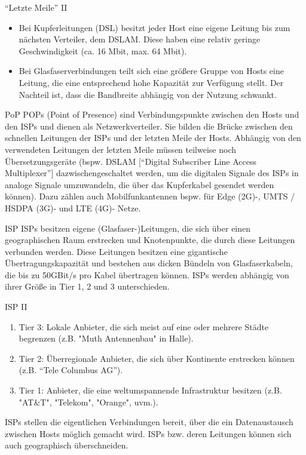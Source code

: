 \documentclass[utf8]{beamer}
\begin{document}
	\begin{frame}{\enquote{Letzte Meile} II}
		\begin{itemize}
			\item{Bei Kupferleitungen (DSL) besitzt jeder Host eine eigene Leitung bis zum nächsten Verteiler, dem DSLAM. Diese haben eine relativ geringe Geschwindigkeit (ca. 16 Mbit, max. 64 Mbit).}
			\item{Bei Glasfaserverbindungen teilt sich eine größere Gruppe von Hosts eine Leitung, die eine entsprechend hohe Kapazität zur Verfügung stellt. Der Nachteil ist, dass die Bandbreite abhängig von der Nutzung schwankt.}
		\end{itemize}
	\end{frame}
	
	\begin{frame}{PoP}
		POPs (Point of Presence) sind Verbindungspunkte zwischen den Hosts und den ISPs und dienen als Netzwerkverteiler. Sie bilden die Brücke zwischen den schnellen Leitungen der ISPs und der letzten Meile der Hosts. Abhängig von den verwendeten Leitungen der letzten Meile müssen teilweise noch Übersetzungsgeräte (bspw. DSLAM [\enquote{Digital Subscriber Line Access Multiplexer}] dazwischengeschaltet werden, um die digitalen Signale des ISPs in analoge Signale umzuwandeln, die über das Kupferkabel gesendet werden können).
		Dazu zählen auch Mobilfunkantennen bspw. für Edge (2G)-, UMTS / HSDPA (3G)- und LTE (4G)- Netze.
	\end{frame}
	
	\begin{frame}{ISP}
		ISPs besitzen eigene (Glasfaser-)Leitungen, die sich über einen geographischen Raum erstrecken und Knotenpunkte, die durch diese Leitungen verbunden werden. Diese Leitungen besitzen eine gigantische Übertragungskapazität und bestehen aus dicken Bündeln von Glasfaserkabeln, die bis zu 50GBit/s pro Kabel übertragen können.
		ISPs werden abhängig von ihrer Größe in Tier 1, 2 und 3 unterschieden.
	\end{frame}

	\begin{frame}{ISP II}
		\begin{enumerate}
			\item{Tier 3: Lokale Anbieter, die sich meist auf eine oder mehrere Städte begrenzen (z.B. "Muth Antennenbau" in Halle).}
			\item{Tier 2: Überregionale Anbieter, die sich über Kontinente erstrecken können (z.B. \enquote{Tele Columbus AG}).} 
			\item{Tier 1: Anbieter, die eine weltumspannende Infrastruktur besitzen (z.B. "AT\&T", "Telekom", "Orange", uvm.).}
		\end{enumerate}
		
		ISPs stellen die eigentlichen Verbindungen bereit, über die ein Datenaustausch zwischen Hosts möglich gemacht wird. ISPs bzw. deren Leitungen können sich auch geographisch überschneiden.
	\end{frame}
	
\end{document}
